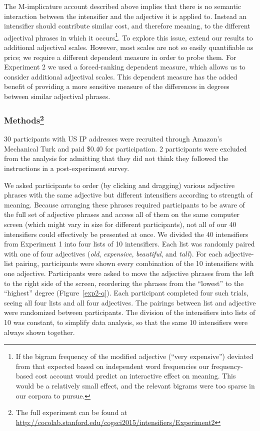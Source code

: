 \documentclass[10pt,letterpaper]{article}
\newcommand{\w}[1]{\emph{#1}}
\begin{document}
The M-implicature account described above implies that there is no semantic interaction between the intensifier and the adjective it is applied to. Instead an intensifier should contribute similar cost, and therefore meaning, to the different adjectival phrases in which it occurs\footnote{If the bigram frequency of the modified adjective (``very expensive'') deviated from that expected based on independent word frequencies our frequency-based cost account would predict an interactive effect on meaning. This would be a relatively small effect, and the relevant bigrams were too sparse in our corpora to pursue.}.
To explore this issue, extend our results to additional adjectival scales. However, most scales are not so easily quantifiable as price; we require a different dependent measure in order to probe them.
For Experiment 2 we used a forced-ranking dependent measure, which allows us to consider additional adjectival scales. This dependent measure has the added benefit of providing a more sensitive measure of the differences in degrees between similar adjectival phrases.

\subsubsection{Methods\footnote{The full experiment can be found at \url{http://cocolab.stanford.edu/cogsci2015/intensifiers/Experiment2}}}

30 participants with US IP addresses were recruited through Amazon's Mechanical Turk and paid \$0.40 for  participation. 2 participants were excluded from the analysis for admitting that they did not think they followed the instructions in a post-experiment survey.

We asked participants to order (by clicking and dragging) various adjective phrases with the same adjective but different intensifiers according to strength of meaning. Because arranging these phrases required participants to be aware of the full set of adjective phrases and access all of them on the same computer screen (which might vary in size for different participants), not all of our 40 intensifiers could effectively be presented at once. We divided the 40 intensifiers from Experiment 1 into four lists of 10 intensifiers. 
Each list was randomly paired with one of four adjectives (\w{old}, \w{expensive}, \w{beautiful}, and \w{tall}).
For each adjective-list pairing, participants were shown every combination of the 10 intensifiers with one adjective.
Participants were asked to move the adjective phrases from the left to the right side of the screen, reordering the phrases from the ``lowest'' to the ``highest'' degree (Figure~\ref{exp2-q}).
Each participant completed four such trials, seeing all four lists and all four adjectives.
The pairings between list and adjective were randomized between participants.
The division of the intensifiers into lists of 10 was constant, to simplify data analysis, so that the same 10 intensifiers were always shown together.
\end{document}
